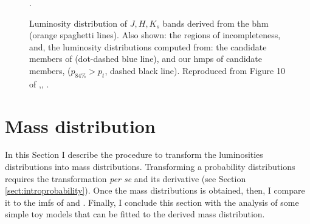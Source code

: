 \begin{figure}[htbp]
\begin{center}
\caption{Luminosity distribution of $J,H,K_s$ bands derived from the \gls{bhm} (orange spaghetti lines). Also shown: the regions of incompleteness, and, the luminosity distributions computed from: the candidate members of \citet{Bouy2015} (dot-dashed blue line), and our \gls{hmps} of candidate members, ($p_{84\%}>p_t$, dashed black line). Reproduced from Figure 10 of \citet{Olivares2017},\textit{},  .}
\label{fig:Luminosities}.
\end{center}
\end{figure}

\section{Mass distribution}
\label{sect:massdistributionresults}

In this Section I describe the procedure to transform the luminosities distributions into mass distributions. Transforming a  probability distributions requires the transformation \emph{per se} and its derivative (see Section \ref{sect:introprobability}). Once the mass distributions is obtained,  then, I compare it to the \glspl{imf} of \citet{Chabrier2005} and \citet{Thies2007}. Finally, I conclude this section with the analysis of some simple toy models that can be fitted to the derived mass distribution.

